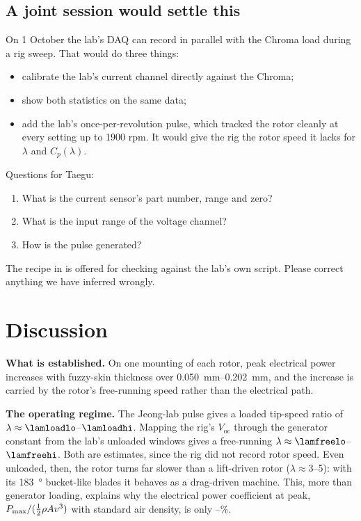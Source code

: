 \documentclass[11pt]{article}
\begin{document}
\subsection{A joint session would settle this}
On 1 October the lab's DAQ can record in parallel with the Chroma load during a rig sweep.
That would do three things:
\begin{itemize}
  \item calibrate the lab's current channel directly against the Chroma;
  \item show both statistics on the same data;
  \item add the lab's once-per-revolution pulse, which tracked the rotor cleanly at every
        setting up to 1900 rpm. It would give the rig the rotor speed it lacks for $\lambda$
        and $C_p(\lambda)$.
\end{itemize}
Questions for Taegu:
\begin{enumerate}
  \item What is the current sensor's part number, range and zero?
  \item What is the input range of the voltage channel?
  \item How is the pulse generated?
\end{enumerate}
The recipe in  is offered for checking against the lab's own script. Please
correct anything we have inferred wrongly.

\section{Discussion}\label{sec:discussion}

\textbf{What is established.} On one mounting of each rotor, peak electrical power increases
with fuzzy-skin thickness over \SIrange{0.050}{0.202}{mm}, and the increase is carried by the
rotor's free-running speed rather than the electrical path.

\textbf{The operating regime.} The Jeong-lab pulse gives a loaded tip-speed ratio of
$\lambda\approx\lamloadlo$–$\lamloadhi$. Mapping the rig's $V_\mathrm{oc}$ through the generator
constant from the lab's unloaded windows gives a free-running $\lambda\approx\lamfreelo$–$\lamfreehi$.
Both are estimates, since the rig did not record rotor speed. Even unloaded, then, the rotor
turns far slower than a lift-driven rotor ($\lambda\approx3$–5): with its \SI{183}{\degree}
bucket-like blades it behaves as a drag-driven machine. This, more than generator loading,
explains why the electrical power coefficient at peak,
$P_{\max}/(\tfrac12\rho A v^3)$ with standard air density, is only \cpelmin–\cpelmax\%.
\end{document}
